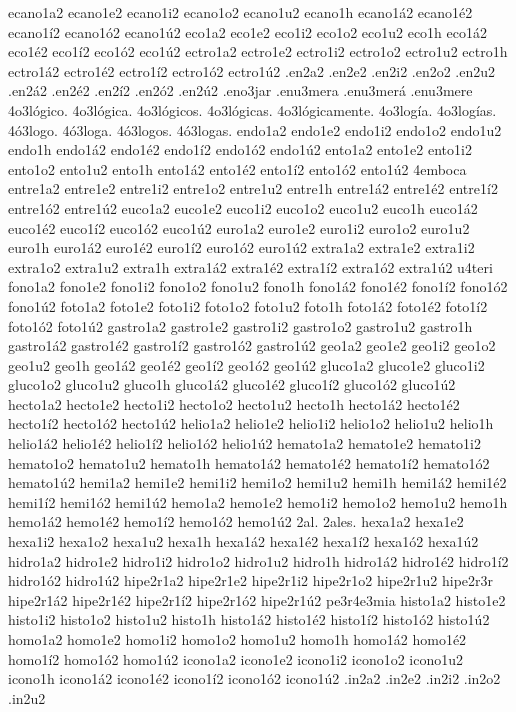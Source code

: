 {ecano1a2 ecano1e2 ecano1i2 ecano1o2 ecano1u2 ecano1h
ecano1á2 ecano1é2 ecano1í2 ecano1ó2 ecano1ú2
eco1a2 eco1e2 eco1i2 eco1o2 eco1u2 eco1h
eco1á2 eco1é2 eco1í2 eco1ó2 eco1ú2
ectro1a2 ectro1e2 ectro1i2 ectro1o2 ectro1u2 ectro1h
ectro1á2 ectro1é2 ectro1í2 ectro1ó2 ectro1ú2
.en2a2 .en2e2 .en2i2 .en2o2 .en2u2
.en2á2 .en2é2 .en2í2 .en2ó2 .en2ú2
.eno3jar
.enu3mera .enu3merá
.enu3mere
4o3lógico. 4o3lógica. 4o3lógicos. 4o3lógicas.
4o3lógicamente. 4o3logía. 4o3logías.
4ó3logo. 4ó3loga. 4ó3logos. 4ó3logas.
endo1a2 endo1e2 endo1i2 endo1o2 endo1u2 endo1h
endo1á2 endo1é2 endo1í2 endo1ó2 endo1ú2
ento1a2 ento1e2 ento1i2 ento1o2 ento1u2 ento1h
ento1á2 ento1é2 ento1í2 ento1ó2 ento1ú2
4emboca
entre1a2 entre1e2 entre1i2 entre1o2 entre1u2 entre1h
entre1á2 entre1é2 entre1í2 entre1ó2 entre1ú2
euco1a2 euco1e2 euco1i2 euco1o2 euco1u2 euco1h
euco1á2 euco1é2 euco1í2 euco1ó2 euco1ú2
euro1a2 euro1e2 euro1i2 euro1o2 euro1u2 euro1h
euro1á2 euro1é2 euro1í2 euro1ó2 euro1ú2
extra1a2 extra1e2 extra1i2 extra1o2 extra1u2 extra1h
extra1á2 extra1é2 extra1í2 extra1ó2 extra1ú2
u4teri
fono1a2 fono1e2 fono1i2 fono1o2 fono1u2 fono1h
fono1á2 fono1é2 fono1í2 fono1ó2 fono1ú2
foto1a2 foto1e2 foto1i2 foto1o2 foto1u2 foto1h
foto1á2 foto1é2 foto1í2 foto1ó2 foto1ú2
gastro1a2 gastro1e2 gastro1i2 gastro1o2 gastro1u2 gastro1h
gastro1á2 gastro1é2 gastro1í2 gastro1ó2 gastro1ú2
geo1a2 geo1e2 geo1i2 geo1o2 geo1u2 geo1h
geo1á2 geo1é2 geo1í2 geo1ó2 geo1ú2
gluco1a2 gluco1e2 gluco1i2 gluco1o2 gluco1u2 gluco1h
gluco1á2 gluco1é2 gluco1í2 gluco1ó2 gluco1ú2
hecto1a2 hecto1e2 hecto1i2 hecto1o2 hecto1u2 hecto1h
hecto1á2 hecto1é2 hecto1í2 hecto1ó2 hecto1ú2
helio1a2 helio1e2 helio1i2 helio1o2 helio1u2 helio1h
helio1á2 helio1é2 helio1í2 helio1ó2 helio1ú2
hemato1a2 hemato1e2 hemato1i2 hemato1o2 hemato1u2 hemato1h
hemato1á2 hemato1é2 hemato1í2 hemato1ó2 hemato1ú2
hemi1a2 hemi1e2 hemi1i2 hemi1o2 hemi1u2 hemi1h
hemi1á2 hemi1é2 hemi1í2 hemi1ó2 hemi1ú2
hemo1a2 hemo1e2 hemo1i2 hemo1o2 hemo1u2 hemo1h
hemo1á2 hemo1é2 hemo1í2 hemo1ó2 hemo1ú2
2al. 2ales.
hexa1a2 hexa1e2 hexa1i2 hexa1o2 hexa1u2 hexa1h
hexa1á2 hexa1é2 hexa1í2 hexa1ó2 hexa1ú2
hidro1a2 hidro1e2 hidro1i2 hidro1o2 hidro1u2 hidro1h
hidro1á2 hidro1é2 hidro1í2 hidro1ó2 hidro1ú2
hipe2r1a2 hipe2r1e2 hipe2r1i2 hipe2r1o2 hipe2r1u2 hipe2r3r
hipe2r1á2 hipe2r1é2 hipe2r1í2 hipe2r1ó2 hipe2r1ú2
pe3r4e3mia
histo1a2 histo1e2 histo1i2 histo1o2 histo1u2 histo1h
histo1á2 histo1é2 histo1í2 histo1ó2 histo1ú2
homo1a2 homo1e2 homo1i2 homo1o2 homo1u2 homo1h
homo1á2 homo1é2 homo1í2 homo1ó2 homo1ú2
icono1a2 icono1e2 icono1i2 icono1o2 icono1u2 icono1h
icono1á2 icono1é2 icono1í2 icono1ó2 icono1ú2
.in2a2 .in2e2 .in2i2 .in2o2 .in2u2
}
